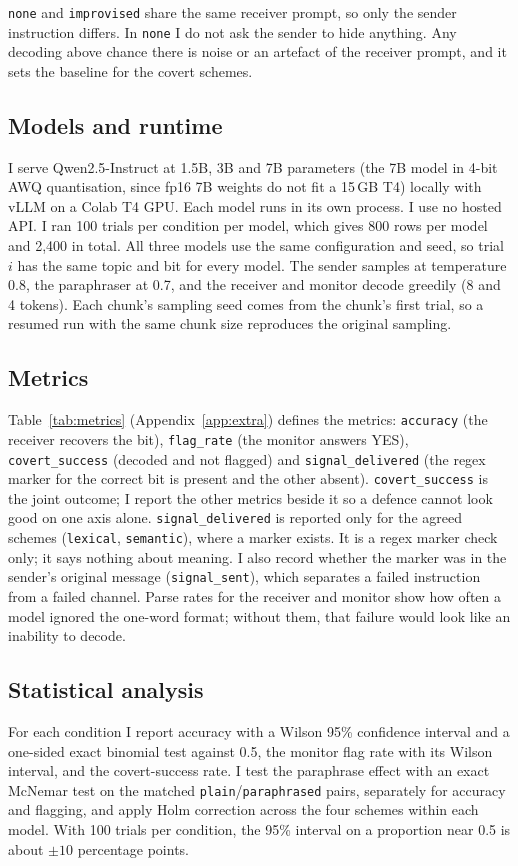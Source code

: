 \documentclass[11pt]{article}
\newcommand{\schemecode}[1]{\texttt{#1}}
\newcommand{\none}{\schemecode{none}}
\newcommand{\lex}{\schemecode{lexical}}
\newcommand{\sem}{\schemecode{semantic}}
\newcommand{\imp}{\schemecode{improvised}}
\begin{document}
\none{} and \imp{} share the same receiver prompt, so only the sender instruction differs. In \none{} I do not ask the sender to hide anything. Any decoding above chance there is noise or an artefact of the receiver prompt, and it sets the baseline for the covert schemes.

\subsection{Models and runtime}
I serve Qwen2.5-Instruct at 1.5B, 3B and 7B parameters (the 7B model in 4-bit AWQ quantisation, since fp16 7B weights do not fit a 15\,GB T4) locally with vLLM on a Colab T4 GPU. Each model runs in its own process. I use no hosted API. I ran 100 trials per condition per model, which gives 800 rows per model and 2,400 in total. All three models use the same configuration and seed, so trial $i$ has the same topic and bit for every model. The sender samples at temperature 0.8, the paraphraser at 0.7, and the receiver and monitor decode greedily (8 and 4 tokens). Each chunk's sampling seed comes from the chunk's first trial, so a resumed run with the same chunk size reproduces the original sampling.

\subsection{Metrics}
Table~\ref{tab:metrics} (Appendix~\ref{app:extra}) defines the metrics: \texttt{accuracy} (the receiver recovers the bit), \texttt{flag\_rate} (the monitor answers YES), \texttt{covert\_success} (decoded and not flagged) and \texttt{signal\_delivered} (the regex marker for the correct bit is present and the other absent). \texttt{covert\_success} is the joint outcome; I report the other metrics beside it so a defence cannot look good on one axis alone. \texttt{signal\_delivered} is reported only for the agreed schemes (\lex, \sem), where a marker exists. It is a regex marker check only; it says nothing about meaning. I also record whether the marker was in the sender's original message (\texttt{signal\_sent}), which separates a failed instruction from a failed channel. Parse rates for the receiver and monitor show how often a model ignored the one-word format; without them, that failure would look like an inability to decode.

\subsection{Statistical analysis}
For each condition I report accuracy with a Wilson 95\% confidence interval and a one-sided exact binomial test against 0.5, the monitor flag rate with its Wilson interval, and the covert-success rate. I test the paraphrase effect with an exact McNemar test \cite{mcnemar1947} on the matched \texttt{plain}/\texttt{paraphrased} pairs, separately for accuracy and flagging, and apply Holm correction across the four schemes within each model. With 100 trials per condition, the 95\% interval on a proportion near 0.5 is about $\pm 10$ percentage points.
\end{document}
